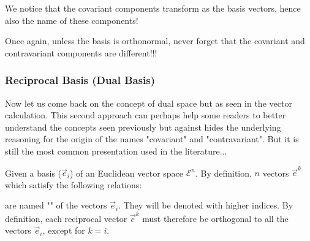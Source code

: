 	We notice that the covariant components transform as the basis vectors, hence also the name of these components!
	
	Once again, unless the basis is orthonormal, never forget that the covariant and contravariant components are different!!!
	
	\subsubsection{Reciprocal Basis (Dual Basis)}
	Now let us come back on the concept of dual space but as seen in the vector calculation. This second approach can perhaps help some readers to better understand the concepts seen previously but against hides the underlying reasoning for the origin of the names "covariant" and "contravariant". But it is still the most common presentation used in the literature...
	
	Given a basis ($\vec{e}_i$) of an Euclidean vector space $\mathcal{E}^n$. By definition, $n$ vectors $\vec{e}^k$ which satisfy the following relations:
	
	are named "" of the vectors $\vec{e}_i$. They will be denoted with higher indices. By definition, each reciprocal vector $\vec{e}^k$ must therefore be orthogonal to all the vectors $\vec{e}_i$, except for $k=i$.
	
